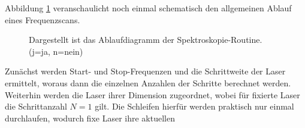 Abbildung \ref{fig:spektroskopie_ablaufdiagramm} veranschaulicht noch einmal
schematisch den allgemeinen Ablauf eines Frequenzscans.
\begin{figure}[hp]
 	\centering
	\caption[Spektroskopie -
	Software-Ablaufdiagramm]{Dargestellt ist das Ablaufdiagramm der
	Spektroskopie-Routine. (j=ja, n=nein)}\label{fig:spektroskopie_ablaufdiagramm}
\end{figure}
Zunächst werden Start- und Stop-Frequenzen und die Schrittweite der Laser
ermittelt, woraus dann die einzelnen Anzahlen der Schritte berechnet werden.
Weiterhin werden die Laser ihrer Dimension zugeordnet, wobei für fixierte
Laser die Schrittanzahl $N=1$ gilt. Die Schleifen hierfür werden
praktisch nur einmal durchlaufen, wodurch fixe Laser ihre aktuellen
